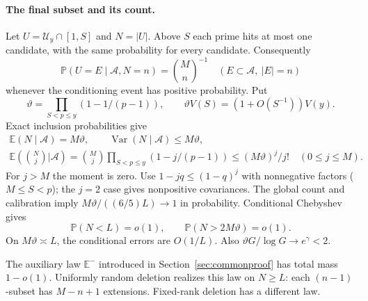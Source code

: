 \documentclass[11pt,a4paper]{article}
\newcommand{\E}{\mathbb E}
\newcommand{\Prob}{\mathbb P}
\begin{document}
\paragraph{The final subset and its count.}
Let $U=\mathcal U_y\cap[1,S]$ and $N=|U|$. Above $S$ each prime
hits at most one candidate, with the same probability for every
candidate. Consequently
\begin{equation}\label{eq:exchangeable}
 \Prob(U=E\mid\mathcal A,N=n)=\binom Mn^{-1}
 \quad(E\subset\mathcal A,\ |E|=n)
\end{equation}
whenever the conditioning event has positive probability. Put
\begin{equation}\label{eq:rho}
 \vartheta=\prod_{S<p\le y}(1-1/(p-1)),\qquad
 \vartheta V(S)=(1+O(S^{-1}))V(y).
\end{equation}
Exact inclusion probabilities give
\begin{equation}\label{eq:exactcounts}
 \begin{gathered}
 \E(N\mid\mathcal A)=M\vartheta,\qquad
 \operatorname{Var}(N\mid\mathcal A)\le M\vartheta,\\
 \E\left(\binom Nj\mathrel{\big|}\mathcal A\right)
 =\binom Mj\prod_{S<p\le y}(1-j/(p-1))
 \le(M\vartheta)^j/j!\quad(0\le j\le M).
 \end{gathered}
\end{equation}
For $j>M$ the moment is zero. Use $1-jq\le(1-q)^j$ with
nonnegative factors ($M\le S<p$); the $j=2$ case gives nonpositive
covariances.
The global count and calibration imply
$M\vartheta/((6/5)L)\to1$ in probability. Conditional Chebyshev gives
\begin{equation}\label{eq:modelspan}
 \Prob(N<L)=o(1),\qquad
 \Prob(N>2M\vartheta)=o(1).
\end{equation}
On $M\vartheta\asymp L$, the conditional errors are $O(1/L)$.
Also $\vartheta G/\log G\to e^\gamma<2$.

The auxiliary law $\E^-$ introduced in Section~\ref{sec:commonproof}
has total mass $1-o(1)$. Uniformly random deletion realizes this law
on $N\ge L$: each $(n-1)$-subset has $M-n+1$ extensions.
Fixed-rank deletion has a different law.
\end{document}
